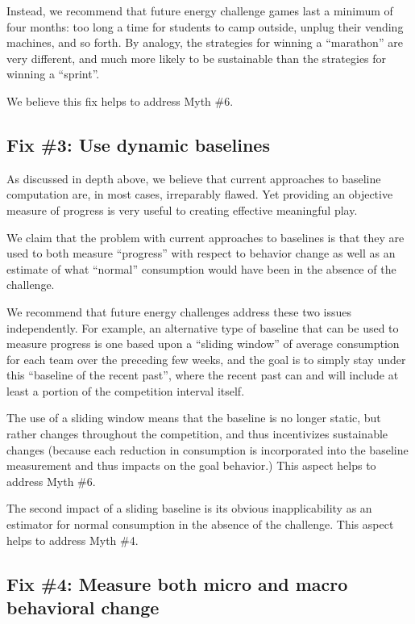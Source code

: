 \documentclass[jou]{apa} %
\begin{document}
Instead, we recommend that future energy challenge games last a minimum of four months:
too long a time for students to camp outside, unplug their vending machines, and so forth.
By analogy, the strategies for winning a ``marathon'' are very different, and much more likely to be
sustainable than the strategies for winning a ``sprint''.

We believe this fix helps to address Myth \#6.

\subsection{Fix \#3: Use dynamic baselines}

As discussed in depth above, we believe that current approaches to baseline computation
are, in most cases, irreparably flawed.  Yet providing an objective measure of progress is
very useful to creating effective meaningful play.  

We claim that the problem with current approaches to baselines is that they are used to
both measure ``progress'' with respect to behavior change as well as an estimate of what
``normal'' consumption would have been in the absence of the challenge.

We recommend that future energy challenges address these two issues independently.  For
example, an alternative type of baseline that can be used to measure progress is one based
upon a ``sliding window'' of average consumption for each team over the preceding few
weeks, and the goal is to simply stay under this ``baseline of the recent past'', where
the recent past can and will include at least a portion of the competition interval itself.

The use of a sliding window means that the baseline is no longer static, but rather
changes throughout the competition, and thus incentivizes sustainable changes (because each
reduction in consumption is incorporated into the baseline measurement and thus impacts on 
the goal behavior.)  This aspect helps to address Myth \#6. 

The second impact of a sliding baseline is its obvious inapplicability as an estimator for
normal consumption in the absence of the challenge.  This aspect helps to address Myth \#4.


\subsection{Fix \#4: Measure both micro and macro behavioral change}
\end{document}
